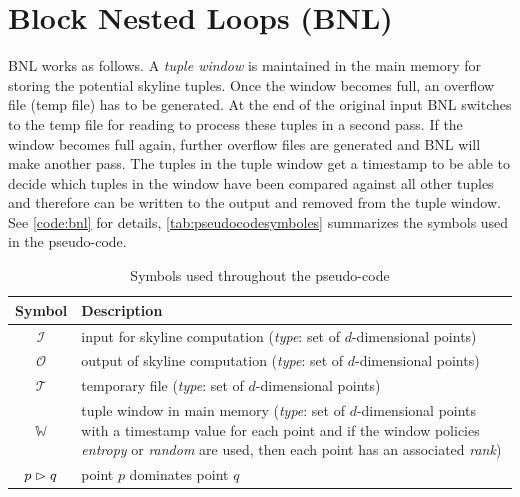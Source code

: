 \section{Block Nested Loops (BNL)}
BNL \citep{Borzsonyi2001} works as follows.  A {\em tuple window} is
maintained in the main memory for storing the potential skyline
tuples.  Once the window becomes full, an overflow file (temp file)
has to be generated.  At the end of the original input BNL switches to
the temp file for reading to process these tuples in a second pass.
If the window becomes full again, further overflow files are generated
and BNL will make another pass.  The tuples in the tuple window get a
timestamp to be able to decide which tuples in the window have been
compared against all other tuples and therefore can be written to the
output and removed from the tuple window. See \autoref{code:bnl} for
details, \autoref{tab:pseudocodesymboles} summarizes the symbols used
in the pseudo-code. 





\begin{table}[htbp]
\centering
\begin{tabular}{cp{100mm}}
Symbol & Description \\
\hline
$\mathcal{I}$ & input for skyline computation (\emph{type}: set of $d$-dimensional points) \\
$\mathcal{O}$ & output of skyline computation (\emph{type}: set of $d$-dimensional points) \\
$\mathcal{T}$ & temporary file (\emph{type}: set of $d$-dimensional points) \\
$\mathbb{W}$ & tuple window in main memory (\emph{type}: set of $d$-dimensional points with a timestamp value for each point and if the window policies \emph{entropy} or \emph{random} are used, then each point has an associated \emph{rank}) \\
$p \vartriangleright q$ & point $p$ dominates point $q$
\end{tabular}
\caption{Symbols used throughout the pseudo-code}
\label{tab:pseudocodesymboles}
\end{table}


